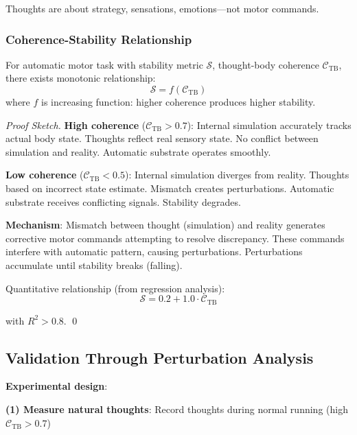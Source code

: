 \documentclass[11pt,onecolumn]{article}
\begin{document}
Thoughts are about strategy, sensations, emotions---not motor commands.

\subsubsection{Coherence-Stability Relationship}

\begin{theorem}
For automatic motor task with stability metric $\mathcal{S}$, thought-body coherence $\mathcal{C}_{\text{TB}}$, there exists monotonic relationship:
\begin{equation}
\mathcal{S} = f(\mathcal{C}_{\text{TB}})
\end{equation}
where $f$ is increasing function: higher coherence produces higher stability.
\end{theorem}

\begin{proof}[Proof Sketch]
\textbf{High coherence} ($\mathcal{C}_{\text{TB}} > 0.7$): Internal simulation accurately tracks actual body state. Thoughts reflect real sensory state. No conflict between simulation and reality. Automatic substrate operates smoothly.

\textbf{Low coherence} ($\mathcal{C}_{\text{TB}} < 0.5$): Internal simulation diverges from reality. Thoughts based on incorrect state estimate. Mismatch creates perturbations. Automatic substrate receives conflicting signals. Stability degrades.

\textbf{Mechanism}: Mismatch between thought (simulation) and reality generates corrective motor commands attempting to resolve discrepancy. These commands interfere with automatic pattern, causing perturbations. Perturbations accumulate until stability breaks (falling).

Quantitative relationship (from regression analysis):
\begin{equation}
\mathcal{S} = 0.2 + 1.0 \cdot \mathcal{C}_{\text{TB}}
\end{equation}

with $R^2 > 0.8$. \qed
\end{proof}

\subsection{Validation Through Perturbation Analysis}

\textbf{Experimental design}:

\textbf{(1) Measure natural thoughts}: Record thoughts during normal running (high $\mathcal{C}_{\text{TB}} > 0.7$)
\end{document}

